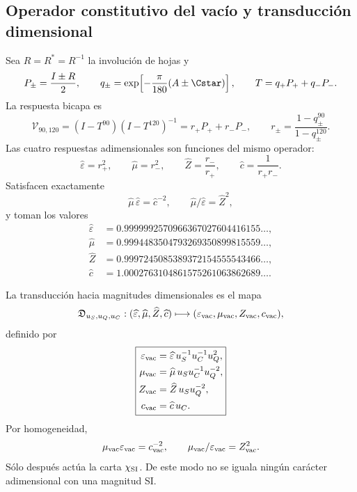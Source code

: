\subsection{Operador constitutivo del vacío y transducción dimensional}

Sea \(R=R^*=R^{-1}\) la involución de hojas y
\[
P_\pm=\frac{I\pm R}{2},
\qquad
q_\pm=\exp\!\left[-\frac{\pi}{180}(A\pm\Cstar)\right],
\qquad T=q_+P_++q_-P_-.
\]
La respuesta bicapa es
\begin{equation}
\mathcal V_{90,120}=(I-T^{90})(I-T^{120})^{-1}
=r_+P_++r_-P_-,
\qquad
r_\pm=\frac{1-q_\pm^{90}}{1-q_\pm^{120}}.
\label{p3-83-c31-s2:eq:vacuum-operator}
\end{equation}
Las cuatro respuestas adimensionales son funciones del mismo operador:
\begin{equation}
\boxed{
\widehat\varepsilon=r_+^2,
\qquad \widehat\mu=r_-^2,
\qquad \widehat Z=\frac{r_-}{r_+},
\qquad \widehat c=\frac1{r_+r_-}.}
\label{p3-83-c31-s2:eq:vacuum-four}
\end{equation}
Satisfacen exactamente
\begin{equation}
\widehat\mu\,\widehat\varepsilon=\widehat c^{-2},
\qquad
\widehat\mu/\widehat\varepsilon=\widehat Z^2,
\label{p3-83-c31-s2:eq:vacuum-identities}
\end{equation}
y toman los valores
\[
\begin{aligned}
\widehat\varepsilon&=0.9999992570966367027604416155\ldots,\\
\widehat\mu&=0.9994483504793269350899815559\ldots,\\
\widehat Z&=0.9997245085389372154555543466\ldots,\\
\widehat c&=1.0002763104861575261063862689\ldots .
\end{aligned}
\]

La transducción hacia magnitudes dimensionales es el mapa
\begin{equation}
\mathfrak D_{u_S,u_Q,u_C}:
(\widehat\varepsilon,\widehat\mu,\widehat Z,\widehat c)
\longmapsto
(\varepsilon_{\rm vac},\mu_{\rm vac},Z_{\rm vac},c_{\rm vac}),
\label{p3-83-c31-s2:eq:vacuum-transducer}
\end{equation}
definido por
\begin{equation}
\boxed{
\begin{aligned}
\varepsilon_{\rm vac}&=\widehat\varepsilon\,u_S^{-1}u_C^{-1}u_Q^2,\\
\mu_{\rm vac}&=\widehat\mu\,u_Su_C^{-1}u_Q^{-2},\\
Z_{\rm vac}&=\widehat Z\,u_Su_Q^{-2},\\
c_{\rm vac}&=\widehat c\,u_C.
\end{aligned}}
\label{p3-83-c31-s2:eq:vacuum-dimensional-sections}
\end{equation}
Por homogeneidad,
\[
\mu_{\rm vac}\varepsilon_{\rm vac}=c_{\rm vac}^{-2},
\qquad
\mu_{\rm vac}/\varepsilon_{\rm vac}=Z_{\rm vac}^2.
\]
Sólo después actúa la carta \(\chi_{\rm SI}\). De este modo no se iguala
ningún carácter adimensional con una magnitud SI.


